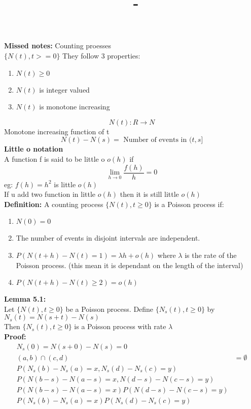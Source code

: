 \documentclass[answers,12pt,addpoints]{exam}
\author{\name}
\title{\course \ - \assignment}
\begin{document}
\maketitle


\newpage
\textbf{Missed notes:}
Counting proesses\\
$\{ N(t), t>=0 \}$
They follow 3 properties:
\begin{enumerate}
    \item $N(t) \geq 0$
    \item $N(t)$ is integer valued
    \item $N(t)$ is monotone increasing
\end{enumerate}
$$N(t): R \to N$$
Monotone increasing function of t\\
$$N(t) -N(s) = \text{ Number of events in } (t,s]$$
\textbf{Little o notation}\\
A function f is said to be little o $o(h)$ if\\
$$ \lim_{h \to 0} \frac{f(h)}{h} = 0$$
eg: $f(h) = h^2$ is little $o(h)$\\
If u add two function in little $o(h)$ then it is still little $o(h)$\\
\textbf{Definition:}
A counting process $\{N(t), t \geq 0\}$ is a Poisson process if:
\begin{enumerate}
    \item $N(0) = 0$
    \item The number of events in disjoint intervals are independent. 
    \item $P(N(t+h) - N(t) = 1) = \lambda h + o(h)$ where $\lambda$ is the rate of the Poisson process. (this mean it is dependant on the length of the interval)
    \item $P(N(t+h) - N(t) \geq 2) = o(h)$
\end{enumerate}
\textbf{Lemma 5.1:}\\
Let $\{N(t), t \geq 0\}$ be a Poisson process. Define $\{N_s(t), t \geq 0 \}$ by $N_s(t) = N(s+t) - N(s)$\\
Then $\{N_s(t), t \geq 0\}$ is a Poisson process with rate $\lambda$\\
\textbf{Proof:}\\
\begin{align*}
    N_s(0) = N(s+0) - N(s) = 0\\
    (a,b) \cap (c,d) &= \emptyset \\
    P(N_s(b) - N_s(a) = x,  N_s(d) - N_s(c) = y)\\
    P(N(b-s) - N(a-s) = x, N(d-s) - N(c-s) = y)\\
    P(N(b-s) - N(a-s) = x)P(N(d-s) - N(c-s) = y)\\
    P(N_s(b) - N_s(a) = x)P(N_s(d) - N_s(c) = y)\\
\end{align*}
\end{document}

